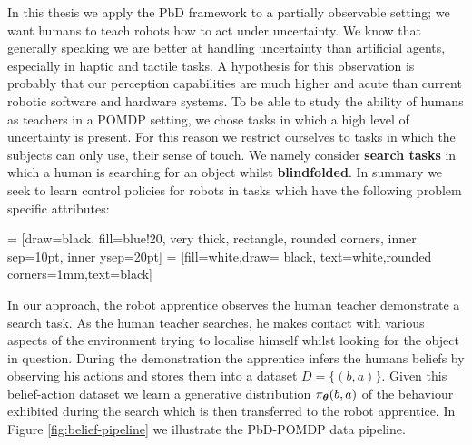 In this thesis we apply the PbD framework to a partially observable setting; we want humans to teach robots how to act under uncertainty.
We know that generally speaking we are better at handling uncertainty than artificial agents, especially in haptic and tactile tasks. 
A hypothesis for this observation is probably that our perception capabilities are much higher and acute than 
current robotic software and hardware systems.
To be able to study the ability of humans as teachers in a POMDP setting, we chose tasks in which a high level of uncertainty is present. For 
this reason we restrict ourselves to tasks in which the subjects can only use, their sense of touch. We namely consider \textbf{search tasks} in 
which a human is searching for an object whilst \textbf{blindfolded}. In summary we seek to learn control policies for robots in 
tasks which have the following problem specific attributes:

  = [draw=black, fill=blue!20, very thick,  rectangle, rounded corners, inner sep=10pt, inner ysep=20pt]
 = [fill=white,draw= black, text=white,rounded corners=1mm,text=black]

\begin{center}
\end{center}

In our approach, the robot apprentice observes the human teacher demonstrate a search task. As the human teacher searches, he makes contact with 
various aspects of the environment trying to localise himself whilst looking for the object in question. During the demonstration the apprentice 
infers the humans beliefs by observing his actions and stores them into a dataset $D = \{(b,a)\}$. Given this belief-action dataset we learn a 
generative distribution $\operatorname{\pi_{\boldsymbol{\theta}}}(b,a)$ of the behaviour exhibited during the search which is then transferred to the robot apprentice.  In Figure
\ref{fig:belief-pipeline} we illustrate the PbD-POMDP data pipeline.

